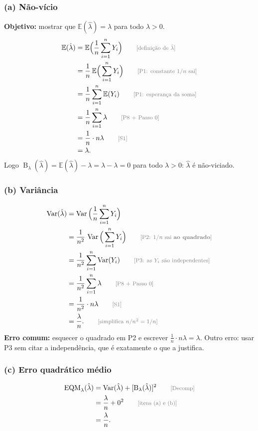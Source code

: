 \documentclass[11pt,a4paper]{article}
\theoremstyle{definition}
\theoremstyle{plain}
\newcommand{\E}{\mathbb{E}}
\newcommand{\Var}{\operatorname{Var}}
\newcommand{\EQM}{\operatorname{EQM}}
\newcommand{\B}{\operatorname{B}}
\newcommand{\just}[1]{\tag*{\footnotesize\textcolor{gray}{[#1]}}}
\begin{document}
\subsubsection*{(a) Não-vício}
\textbf{Objetivo:} mostrar que $\E(\hat\lambda)=\lambda$ para todo $\lambda>0$.
\begin{align*}
\E(\hat\lambda)&=\E\Big(\frac1n\sum_{i=1}^nY_i\Big) \just{definição de $\hat\lambda$}\\
&=\frac1n\,\E\Big(\sum_{i=1}^nY_i\Big) \just{P1: constante $1/n$ sai}\\
&=\frac1n\sum_{i=1}^n\E(Y_i) \just{P1: esperança da soma}\\
&=\frac1n\sum_{i=1}^n\lambda \just{P8 + Passo 0}\\
&=\frac1n\cdot n\lambda \just{S1}\\
&=\lambda .
\end{align*}
Logo $\B_\lambda(\hat\lambda)=\E(\hat\lambda)-\lambda=\lambda-\lambda=0$ para todo $\lambda>0$: $\hat\lambda$ é não-viciado.

\subsubsection*{(b) Variância}
\begin{align*}
\Var(\hat\lambda)&=\Var\Big(\frac1n\sum_{i=1}^nY_i\Big)\\
&=\frac1{n^2}\,\Var\Big(\sum_{i=1}^nY_i\Big) \just{P2: $1/n$ sai \textbf{ao quadrado}}\\
&=\frac1{n^2}\sum_{i=1}^n\Var(Y_i) \just{P3: as $Y_i$ são independentes}\\
&=\frac1{n^2}\sum_{i=1}^n\lambda \just{P8 + Passo 0}\\
&=\frac1{n^2}\cdot n\lambda \just{S1}\\
&=\frac{\lambda}{n}. \just{simplifica $n/n^2=1/n$}
\end{align*}
\textbf{Erro comum:} esquecer o quadrado em P2 e escrever $\frac1n\cdot n\lambda=\lambda$. Outro erro: usar P3 sem citar a independência, que é exatamente o que a justifica.

\subsubsection*{(c) Erro quadrático médio}
\begin{align*}
\EQM_\lambda(\hat\lambda)&=\Var(\hat\lambda)+[\B_\lambda(\hat\lambda)]^2 \just{Decomp}\\
&=\frac{\lambda}{n}+0^2 \just{itens (a) e (b)}\\
&=\frac{\lambda}{n}.
\end{align*}
\end{document}

